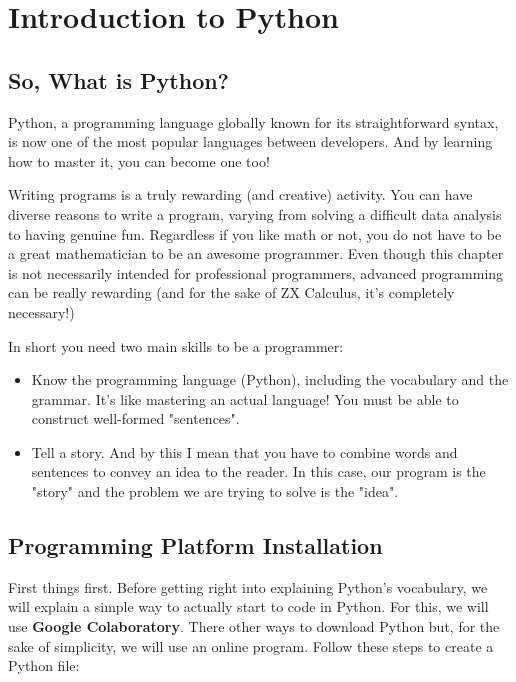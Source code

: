 \chapter{Introduction to Python}
\label{ch:python}

\begin{center}
\end{center}

\section{So, What is Python?}
Python, a programming language globally known for its straightforward syntax, is now one of the most popular languages between developers. And by learning how to master it, you can become one too!

Writing programs is a truly rewarding (and creative) activity. You can have diverse reasons to write a program, varying from solving a difficult data analysis to having genuine fun. Regardless if you like math or not, you do not have to be a great mathematician to be an awesome programmer. 
Even though this chapter is not necessarily intended for professional programmers, advanced programming can be really rewarding (and for the sake of ZX Calculus, it's completely necessary!)

In short you need two main skills to be a programmer:
\begin{itemize}
    \item Know the programming language (Python), including the vocabulary and the grammar. It's like mastering an actual language! You must be able to construct well-formed "sentences".
    \item Tell a story. And by this I mean that you have to combine words and sentences to convey an idea to the reader. In this case, our program is the "story" and the problem we are trying to solve is the "idea".
\end{itemize}

\section{Programming Platform Installation}
First things first. Before getting right into explaining Python's vocabulary, we will explain a simple way to actually start to code in Python. For this, we will use \textbf{Google Colaboratory}. There other ways to download Python but, for the sake of simplicity, we will use an online program. Follow these steps to create a Python file:

